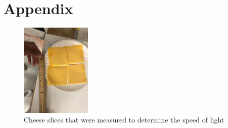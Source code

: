 \documentclass[conference]{IEEEtran}
\begin{document}
\section{Appendix}

\begin{figure}[htbp]
\centerline{\includegraphics[width=0.3\textwidth]{cheese.jpg}}
\caption{Cheese slices that were measured to determine the speed of light}
\label{Cheese Slice Measurment Setup}
\end{figure}




\end{document}
